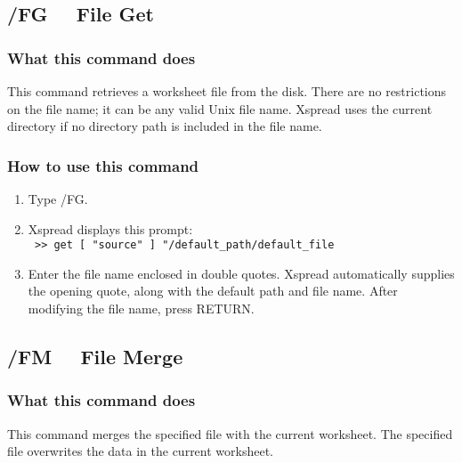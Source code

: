 \subsection*{/FG \ \     File Get}

\subsubsection*{What this command does}
This command retrieves a worksheet file from the disk.  There are no 
restrictions on the file name; it can be any valid Unix file name.  
Xspread uses the current directory if no directory path is included in 
the file name.

\subsubsection*{How to use this command}
\begin{enumerate}
\item{Type /FG.}
\item{Xspread displays this prompt:\\
        \verb| >> get [ "source" ] "/default_path/default_file| }
\item{Enter the file name enclosed in double quotes.  Xspread
        automatically supplies the opening quote, along with the default
	path and file name.  After modifying the
        file name, press RETURN.}
\end{enumerate}
        
\subsection*{/FM \ \     File Merge}

\subsubsection*{What this command does}
This command merges the specified file with the current worksheet.  
The specified file overwrites the data in the current worksheet.

